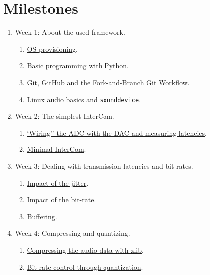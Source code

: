 \section{Milestones}
\begin{enumerate}
\item Week 1: About the used framework.
\begin{enumerate}
\item \href{https://tecnologias-multimedia.github.io/study_guide/01-provisioning/}{OS provisioning}.
\item \href{https://tecnologias-multimedia.github.io/study_guide/02-python/}{Basic programming with Python}.
\item \href{https://tecnologias-multimedia.github.io/study_guide/03-git/}{Git, GitHub and the Fork-and-Branch Git Workflow}.
\item \href{https://tecnologias-multimedia.github.io/study_guide/Linux_audio/}{Linux audio basics and \texttt{sounddevice}}.
\end{enumerate}
\item Week 2: The simplest InterCom.
\begin{enumerate}
\item \href{https://tecnologias-multimedia.github.io/study_guide/04-wiring/}{`Wiring'' the ADC with the DAC and measuring latencies}.
\item \href{https://tecnologias-multimedia.github.io/study_guide/05-minimal/}{Minimal InterCom}.
\end{enumerate}
\item Week 3: Dealing with transmission latencies and bit-rates.
\begin{enumerate}
\item \href{https://tecnologias-multimedia.github.io/study_guide/06-jitter_impact/}{Impact of the jitter}.
\item \href{https://tecnologias-multimedia.github.io/study_guide/07-bit-rate_impact/}{Impact of the bit-rate}.
\item \href{https://tecnologias-multimedia.github.io/study_guide/08-buffer/}{Buffering}.
\end{enumerate}
\item Week 4: Compressing and quantizing.
\begin{enumerate}
\item \href{https://tecnologias-multimedia.github.io/study_guide/09-compress/}{Compressing the audio data with zlib}.
\item \href{https://tecnologias-multimedia.github.io/study_guide/10-br_control/}{Bit-rate control through quantization}.

\end{enumerate}
\end{enumerate}

